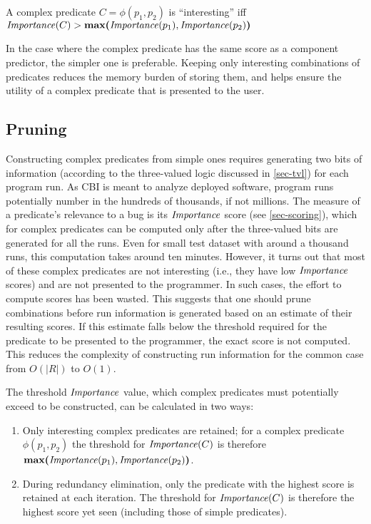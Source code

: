 \begin{defn}
\label{dfn3}
A complex predicate $C = \phi(p_1, p_2)$ is ``interesting'' iff $\mathit{Importance}(C) > \textbf{max(}\mathit{Importance}(p_1), \mathit{Importance}(p_2)\textbf{)}$
\end{defn}

In the case where the complex predicate has the same score as a component predictor, the simpler one is preferable.  Keeping only interesting combinations of predicates reduces the memory burden of storing them, and helps ensure the utility of a complex predicate that is presented to the user.

\subsection{Pruning}
\label{sec-pruning}
Constructing complex predicates from simple ones requires generating two bits of information (according to the three-valued logic discussed in \autoref{sec-tvl}) for each program run.  As CBI is meant to analyze deployed software, program runs potentially number in the hundreds of thousands, if not millions.  The measure of a predicate's relevance to a bug is its $\mathit{Importance}$ score (see \autoref{sec-scoring}), which for complex predicates can be computed only after the three-valued bits are generated for all the runs.  Even for small test dataset with around a thousand runs, this computation takes around ten minutes.  However, it turns out that most of these complex predicates are not interesting (i.e., they have low $\mathit{Importance}$ scores) and are not presented to the programmer.  In such cases, the effort to compute scores has been wasted.  This suggests that one should prune combinations before run information is generated based on an estimate of their resulting scores.  If this estimate falls below the threshold required for the predicate to be presented to the programmer, the exact score is not computed.  This reduces the complexity of constructing run information for the common case from $O(|R|)$ to $O(1)$.

The threshold $\mathit{Importance}$ value, which complex predicates must potentially exceed to be constructed, can be calculated in two ways:
\begin{enumerate}
\item Only interesting complex predicates are retained; for a complex predicate $\phi(p_1, p_2)$ the threshold for $\mathit{Importance}(C)$ is therefore $\textbf{max(}\mathit{Importance}(p_1), \mathit{Importance}(p_2)\textbf{)}$.
\item During redundancy elimination, only the predicate with the highest score is retained at each iteration.  The threshold for $\mathit{Importance}(C)$ is therefore the highest score yet seen (including those of simple predicates).
\end{enumerate}

